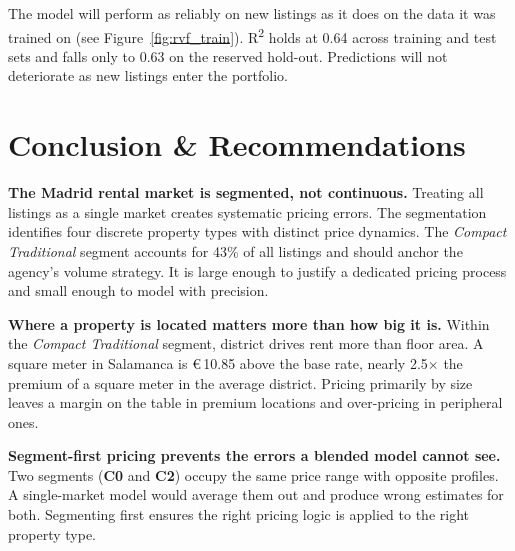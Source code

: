 \documentclass[10pt,a4paper,twocolumn]{article}
\newcommand{\cluster}[1]{\textbf{C#1}}
\newcommand{\eur}[1]{€\,#1}
\newcommand{\seg}[1]{\textit{#1}}          %
\begin{document}
The model will perform as reliably on new listings as it does on the data it was trained on (see Figure~\ref{fig:rvf_train}). R\textsuperscript{2} holds at 0.64 across training and test sets and falls only to 0.63 on the reserved hold-out. Predictions will not deteriorate as new listings enter the portfolio.

\section{Conclusion \& Recommendations}

\textbf{The Madrid rental market is segmented, not continuous.} Treating all listings as a single market creates systematic pricing errors. The segmentation identifies four discrete property types with distinct price dynamics. The \seg{Compact Traditional} segment accounts for 43\% of all listings and should anchor the agency's volume strategy. It is large enough to justify a dedicated pricing process and small enough to model with precision.

\textbf{Where a property is located matters more than how big it is.} Within the \seg{Compact Traditional} segment, district drives rent more than floor area. A square meter in Salamanca is \eur{10.85} above the base rate, nearly 2.5$\times$ the premium of a square meter in the average district. Pricing primarily by size leaves a margin on the table in premium locations and over-pricing in peripheral ones.

\textbf{Segment-first pricing prevents the errors a blended model cannot see.} Two segments (\cluster{0} and \cluster{2}) occupy the same price range with opposite profiles. A single-market model would average them out and produce wrong estimates for both. Segmenting first ensures the right pricing logic is applied to the right property type.
\end{document}
